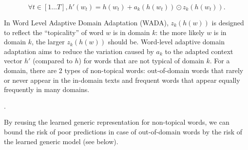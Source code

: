 \documentclass[12pt,times,a4paper,twoside]{article}
\newcommand{\fyTodo}[1]{\Todo[FY:]{\textcolor{orange}{#1}}}
\theoremstyle{definition}
\begin{document}
\begin{equation}
   \forall t \in [1 \dots{} T], h'(w_t) = h(w_t) + a_k(h(w_t)) \odot{} z_k(h(w_t)). \label{eq:gated-residual}
\end{equation}
 
In Word Level Adaptive Domain Adaptation (WADA), $z_k(h(w))$ is designed to reflect the ``topicality'' of  word $w$ is in domain $k$: the more likely $w$ is in domain $k$, the larger $z_k(h(w))$ should be. Word-level adaptive domain adaptation aims to reduce the variation caused by $a_k$ to the adapted context vector $h'$ (compared to $h$) for words that are not typical of domain $k$. For a domain, there are 2 types of non-topical words: out-of-domain words that rarely or never appear in the in-domain texts and frequent words that appear equally frequently in many domains. \fyTodo{This is like a poor Tf-idf - can be because tf is small or because idf is small} 

\fyTodo{Experiment: compute posterior probability of words that have poor $tf-idf$ to verify the gating operation}. 

By reusing the learned generic representation for non-topical words, we can bound the risk of poor predictions in case of out-of-domain words by the risk of the learned generic model (see below).
\end{document}
